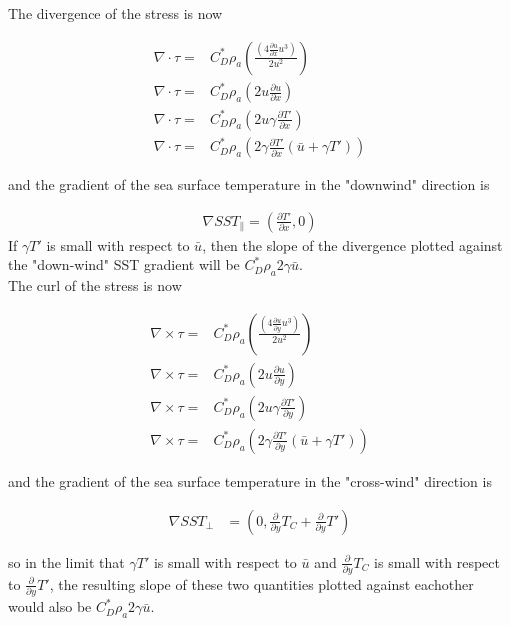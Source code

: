 \documentclass[12pt,a4paper]{article}
\newcommand{\dudx}{\frac{\partial u}{\partial x}}
\newcommand{\dudy}{\frac{\partial u}{\partial y}}
\newcommand{\dTpdx}{\frac{\partial T'}{\partial x}}
\newcommand{\dTpdy}{\frac{\partial T'}{\partial y}}
\begin{document}
The divergence of the stress is now

\begin{align*}
\nabla \cdot \tau =& C_D^* \rho_a \left( \frac{(4\dudx u^3)}{2u^2} \right)\\
\nabla \cdot \tau =& C_D^* \rho_a \left( 2u\dudx \right)\\
\nabla \cdot \tau =& C_D^* \rho_a \left( 2u\gamma\dTpdx  \right)\\
\nabla \cdot \tau =& C_D^* \rho_a \left( 2\gamma\dTpdx (\bar{u} + \gamma T') \right)
\end{align*}

and the gradient of the sea surface temperature in the "downwind" direction is 

\begin{align*}
\nabla SST_{\parallel} = \left( \dTpdx, 0 \right)
\end{align*}
If $\gamma T'$ is small with respect to $\bar{u}$, then the slope of the divergence plotted against the "down-wind" SST gradient will be $C_D^*\rho_a 2\gamma\bar{u}$. \\

The curl of the stress is now

\begin{align*}
\nabla \times \tau =& C_D^* \rho_a \left( \frac{(4\dudy u^3 )}{2u^2} \right)\\
\nabla \times \tau =& C_D^* \rho_a \left(  2u\dudy \right)\\
\nabla \times \tau =& C_D^* \rho_a \left(  2u\gamma\dTpdy \right)\\
\nabla \times \tau =& C_D^* \rho_a \left( 2\gamma\dTpdy (\bar{u} + \gamma T') \right)
\end{align*}

and the gradient of the sea surface temperature in the "cross-wind" direction is 

\begin{align*}
\nabla SST_{\bot} &= \left(0 , \frac{\partial}{\partial y}T_C+ \frac{\partial}{\partial y}T' \right)
\end{align*}

so in the limit that  $\gamma T'$ is small with respect to $\bar{u}$ and $\frac{\partial}{\partial y}T_C$ is small with respect to $\frac{\partial}{\partial y}T'$, the resulting slope of these two quantities plotted against eachother would also be $C_D^* \rho_a 2\gamma\bar{u}$. \\




\end{document}
